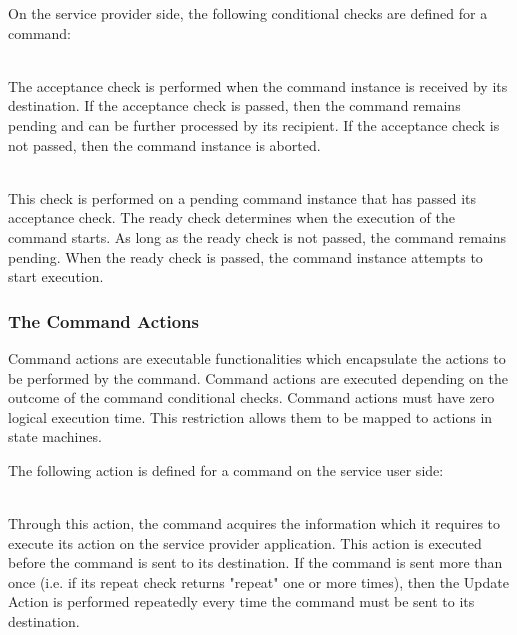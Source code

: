 On the service provider side, the following conditional checks are defined for a command:

\begin{fw_description}
\item[Acceptance Check]\hfill\\
The acceptance check is performed when the command instance is received by its destination. If the acceptance check is passed, then the command remains pending and can be further processed by its recipient. If the acceptance check is not passed, then the command instance is aborted.

\item[Ready Check]\hfill\\
This check is performed on a pending command instance that has passed its acceptance check. The ready check determines when the execution of the command starts.  As long as the ready check is not passed, the command remains pending. When the ready check is passed, the command instance attempts to start execution.
\end{fw_description}

\subsubsection{The Command Actions}\label{sec:CmdActions}
Command actions are executable functionalities which encapsulate the actions to be performed by the command. Command actions are executed depending on the outcome of the command conditional checks. Command actions must have zero logical execution time. This restriction allows them to be mapped to actions in state machines. 

The following action is defined for a command on the service user side:

\begin{fw_description}
\item[Update Action]\hfill\\
Through this action, the command acquires the information which it requires to execute its action on the service provider application. This action is executed before the command is sent to its destination. If the command is sent more than once (i.e. if its repeat check returns "repeat" one or more times), then the Update Action is performed repeatedly every time the command must be sent to its destination.
\end{fw_description} 

